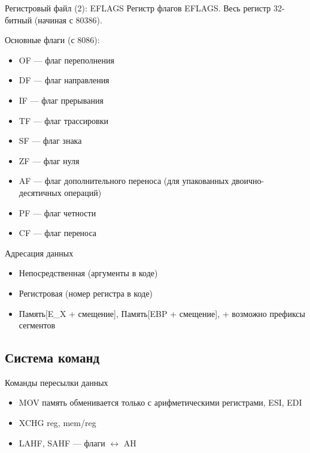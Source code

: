 \documentclass[xetex,aspectratio=43]{beamer}
\begin{document}
\begin{frame}{Регистровый файл (2): EFLAGS}
Регистр флагов EFLAGS.
    Весь регистр 32-битный (начиная с 80386).

    Основные флаги (с 8086):

    \begin{itemize}
        \tightlist
        \item
        OF --- флаг переполнения
        \item
        DF --- флаг направления
        \item
        IF --- флаг прерывания
        \item
        TF --- флаг трассировки
        \item
        SF --- флаг знака
        \item
        ZF --- флаг нуля
        \item
        AF --- флаг дополнительного переноса (для упакованных
        двоично-десятичных операций)
        \item
        PF --- флаг четности
        \item
        CF --- флаг переноса
    \end{itemize}
\end{frame}

\begin{frame}{Адресация данных}
    \begin{itemize}
        \item
        Непосредственная (аргументы в коде)
        \item
        Регистровая (номер регистра в коде)
        \item
        Память{[}E\_X + смещение{]}, Память{[}EBP + смещение{]}, + возможно
        префиксы сегментов
    \end{itemize}
\end{frame}

\subsection{Система команд}

\begin{frame}{Команды пересылки данных}
    \begin{itemize}
        \tightlist
        \item
        MOV память обменивается только с арифметическими регистрами, ESI, EDI
        \item
        XCHG reg, mem/reg
        \item
        LAHF, SAHF --- флаги \(\leftrightarrow\) AH
    \end{itemize}
\end{frame}
\end{document}
